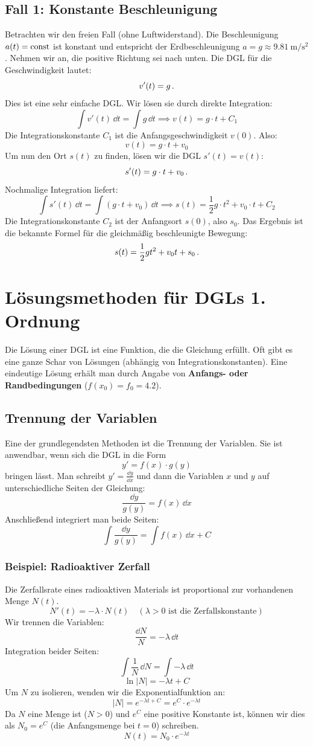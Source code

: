 \subsection{Fall 1: Konstante Beschleunigung}
Betrachten wir den freien Fall (ohne Luftwiderstand). Die Beschleunigung $a(t) = \mathrm{const}$ ist konstant und entspricht der Erdbeschleunigung $a = g \approx \SI{9.81}{\meter\per\second\squared}$. Nehmen wir an, die positive Richtung sei nach unten.
Die DGL für die Geschwindigkeit lautet:
\[ v'(t) = g \,. \]
Dies ist eine sehr einfache DGL. Wir lösen sie durch direkte Integration:
\[ \int v'(t) \, \dd t = \int g \, \dd t \implies v(t) = g \cdot t + C_1 \]
Die Integrationskonstante $C_1$ ist die Anfangsgeschwindigkeit $v(0)$. Also:
\[ v(t) = g \cdot t + v_0 \]
Um nun den Ort $s(t)$ zu finden, lösen wir die DGL $s'(t) = v(t)$:
\[ s'(t) = g \cdot t + v_0 \,.\]
Nochmalige Integration liefert:
\[ \int s'(t) \, \dd t = \int (g \cdot t + v_0) \, \dd t \implies s(t) = \frac{1}{2}g \cdot t^2 + v_0 \cdot t + C_2 \]
Die Integrationskonstante $C_2$ ist der Anfangsort $s(0)$, also $s_0$. Das Ergebnis ist die bekannte Formel für die gleichmäßig beschleunigte Bewegung:
\[ s(t) = \frac{1}{2}gt^2 + v_0 t + s_0 \,.\]

\section{Lösungsmethoden für DGLs 1. Ordnung}
Die Lösung einer DGL ist eine Funktion, die die Gleichung erfüllt. Oft gibt es eine ganze Schar von Lösungen (abhängig von Integrationskonstanten). Eine eindeutige Lösung erhält man durch Angabe von \textbf{Anfangs- oder Randbedingungen} (\zB $f(x_0) = f_0 = 4.2$).

\subsection{Trennung der Variablen}
Eine der grundlegendsten Methoden ist die Trennung der Variablen. Sie ist anwendbar, wenn sich die DGL in die Form
\[ y' = f(x) \cdot g(y) \]
bringen lässt. Man schreibt $y' = \frac{\dd y}{\dd x}$ und  dann die Variablen $x$ und $y$ auf unterschiedliche Seiten der Gleichung:
\[ \frac{\dd y}{g(y)} = f(x) \, \dd x \]
Anschließend integriert man beide Seiten:
\[ \int \frac{\dd y}{g(y)} = \int f(x) \, \dd x + C \]

\subsubsection{Beispiel: Radioaktiver Zerfall}\label{subsubsec: dgl_radioaktiver_zerfall}
Die Zerfallsrate eines radioaktiven Materials ist proportional zur vorhandenen Menge $N(t)$.
\[ N'(t) = -\lambda \cdot N(t) \quad (\lambda > 0 \text{ ist die Zerfallskonstante}) \]
Wir trennen die Variablen:
\[ \frac{\dd N}{N} = -\lambda \, \dd t \]
Integration beider Seiten:
\[ \int \frac{1}{N} \, \dd N = \int -\lambda \, \dd t \]
\[ \ln|N| = -\lambda t + C \]
Um $N$ zu isolieren, wenden wir die Exponentialfunktion an:
\[ |N| = e^{-\lambda t + C} = e^C \cdot e^{-\lambda t} \]
Da $N$ eine Menge ist ($N>0$) und $e^C$ eine positive Konstante ist, können wir dies als $N_0 = e^C$ (die Anfangsmenge bei $t = 0$) schreiben.
\[ N(t) = N_0 \cdot e^{-\lambda t} \]

